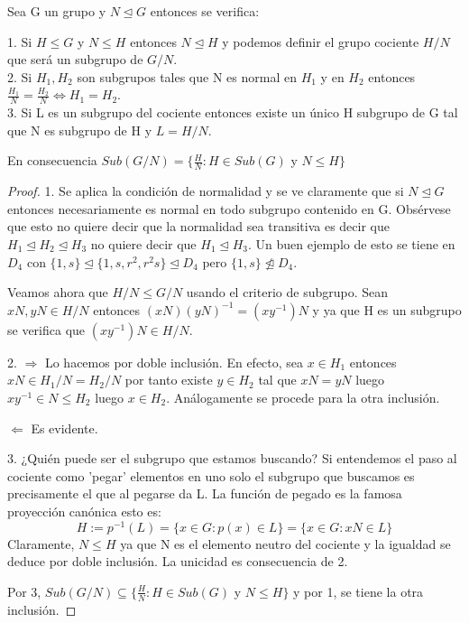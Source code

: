 \begin{nprop}
Sea G un grupo y $N \unlhd G$ entonces se verifica:

1. Si $H \le G$ y $N \le H$ entonces $N \unlhd H$ y podemos definir el grupo cociente $H/N$ que será un subgrupo de $G/N$.\\
2. Si $H_1,H_2$ son subgrupos tales que N es normal en $H_1$ y en $H_2$ entonces $\frac{H_1}{N} = \frac{H_2}{N} \iff H_1 = H_2$. \\
3. Si L es un subgrupo del cociente entonces existe un único H subgrupo de G tal que N es subgrupo de H y $L = H/N$.

En consecuencia $Sub(G/N) = \{\frac{H}{N}:H \in Sub(G)$ y $N \le H\}$
\end{nprop}
\begin{proof}
1. Se aplica la condición de normalidad y se ve claramente que si $N \unlhd G$ entonces necesariamente es normal en todo subgrupo contenido en G. Obsérvese que esto no quiere decir que la normalidad sea transitiva es decir que $H_1 \unlhd H_2 \unlhd H_3$ no quiere decir que $H_1 \unlhd H_3$. Un buen ejemplo de esto se tiene en $D_4$ con $\{1,s\} \unlhd \{1,s,r^2,r^2s\} \unlhd D_4$ pero $\{1,s\} \ntrianglelefteq D_4$.

Veamos ahora que $H/N \le G/N$ usando el criterio de subgrupo. Sean $xN,yN \in H/N$ entonces $(xN)(yN)^{-1} = (xy^{-1})N$ y ya que H es un subgrupo se verifica que $(xy^{-1})N \in H/N$.

2. $\Rightarrow$ Lo hacemos por doble inclusión. En efecto, sea $x \in H_1$ entonces $xN \in H_1/N = H_2/N$ por tanto existe $y \in H_2$ tal que $xN = yN$ luego $xy^{-1} \in N \le    H_2$ luego $x \in H_2$. Análogamente se procede para la otra inclusión.

$\Leftarrow$ Es evidente.

3. ¿Quién puede ser el subgrupo que estamos buscando? Si entendemos el paso al cociente como 'pegar' elementos en uno solo el subgrupo que buscamos es precisamente el que al pegarse da L. La función de pegado es la famosa proyección canónica esto es: $$H:=p^{-1}(L) = \{x \in G : p(x) \in L\} = \{x \in G:xN \in L\}$$ Claramente, $N \le H$ ya que N es el elemento neutro del cociente y la igualdad se deduce por doble inclusión. La unicidad es consecuencia de 2.

Por 3, $Sub(G/N) \subseteq \{\frac{H}{N}:H \in Sub(G)$ y $N \le H\}$ y por 1, se tiene la otra inclusión.
\end{proof}


